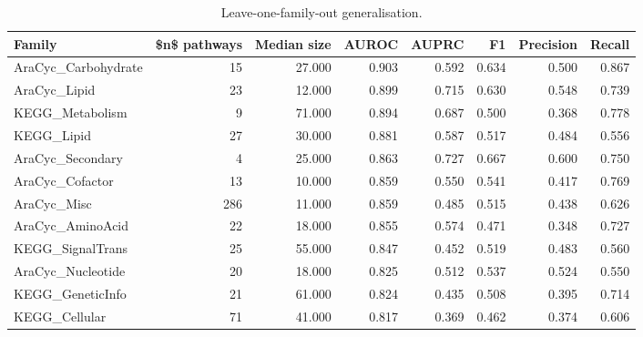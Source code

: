 \begin{table}[htbp]
\centering
\caption{Leave-one-family-out generalisation.}
\label{tab:lofo_recomputed}
\begin{tabular}{lrrrrrrr}
\toprule
Family & \$n\$ pathways & Median size & AUROC & AUPRC & F1 & Precision & Recall \\
\midrule
AraCyc\_Carbohydrate & 15 & 27.000 & 0.903 & 0.592 & 0.634 & 0.500 & 0.867 \\
AraCyc\_Lipid & 23 & 12.000 & 0.899 & 0.715 & 0.630 & 0.548 & 0.739 \\
KEGG\_Metabolism & 9 & 71.000 & 0.894 & 0.687 & 0.500 & 0.368 & 0.778 \\
KEGG\_Lipid & 27 & 30.000 & 0.881 & 0.587 & 0.517 & 0.484 & 0.556 \\
AraCyc\_Secondary & 4 & 25.000 & 0.863 & 0.727 & 0.667 & 0.600 & 0.750 \\
AraCyc\_Cofactor & 13 & 10.000 & 0.859 & 0.550 & 0.541 & 0.417 & 0.769 \\
AraCyc\_Misc & 286 & 11.000 & 0.859 & 0.485 & 0.515 & 0.438 & 0.626 \\
AraCyc\_AminoAcid & 22 & 18.000 & 0.855 & 0.574 & 0.471 & 0.348 & 0.727 \\
KEGG\_SignalTrans & 25 & 55.000 & 0.847 & 0.452 & 0.519 & 0.483 & 0.560 \\
AraCyc\_Nucleotide & 20 & 18.000 & 0.825 & 0.512 & 0.537 & 0.524 & 0.550 \\
KEGG\_GeneticInfo & 21 & 61.000 & 0.824 & 0.435 & 0.508 & 0.395 & 0.714 \\
KEGG\_Cellular & 71 & 41.000 & 0.817 & 0.369 & 0.462 & 0.374 & 0.606 \\
\bottomrule
\end{tabular}

\end{table}
